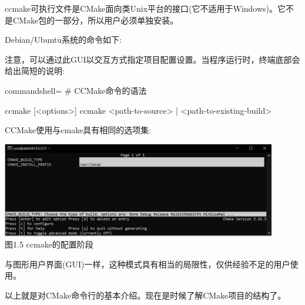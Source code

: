 
ccmake可执行文件是CMake面向类Unix平台的接口(它不适用于Windows)。它不是CMake包的一部分，所以用户必须单独安装。
 
Debian/Ubuntu系统的命令如下:
 
 
注意，可以通过此GUI以交互方式指定项目配置设置。当程序运行时，终端底部会给出简短的说明:
 
\begin{tcblisting}{commandshell={}}
# CCMake命令的语法

ccmake [<options>]
ccmake {<path-to-source> | <path-to-existing-build>}
\end{tcblisting}
 
CCMake使用与cmake具有相同的选项集:
 
\begin{center}
\includegraphics[width=0.9\textwidth]{content/1/chapter1/images/5.jpg}\\
图1.5  ccmake的配置阶段
\end{center}
 
与图形用户界面(GUI)一样，这种模式具有相当的局限性，仅供经验不足的用户使用。

以上就是对CMake命令行的基本介绍。现在是时候了解CMake项目的结构了。
 
 
 
 
 
 
 
 
 
 
 
 
 
 
 
 